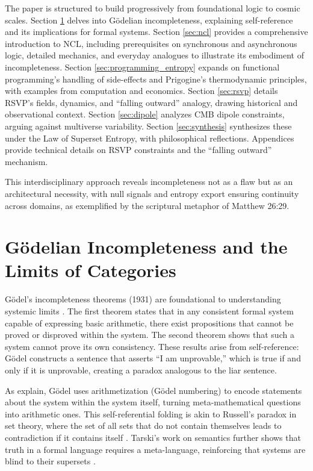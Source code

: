 \documentclass{article}
\begin{document}
The paper is structured to build progressively from foundational logic to cosmic scales. Section \ref{sec:godel} delves into G\"{o}delian incompleteness, explaining self-reference and its implications for formal systems. Section \ref{sec:ncl} provides a comprehensive introduction to NCL, including prerequisites on synchronous and asynchronous logic, detailed mechanics, and everyday analogues to illustrate its embodiment of incompleteness. Section \ref{sec:programming_entropy} expands on functional programming's handling of side-effects and Prigogine's thermodynamic principles, with examples from computation and economics. Section \ref{sec:rsvp} details RSVP's fields, dynamics, and ``falling outward'' analogy, drawing historical and observational context. Section \ref{sec:dipole} analyzes CMB dipole constraints, arguing against multiverse variability. Section \ref{sec:synthesis} synthesizes these under the Law of Superset Entropy, with philosophical reflections. Appendices provide technical details on RSVP constraints and the ``falling outward'' mechanism.

This interdisciplinary approach reveals incompleteness not as a flaw but as an architectural necessity, with null signals and entropy export ensuring continuity across domains, as exemplified by the scriptural metaphor of Matthew 26:29.

\section{G\"{o}delian Incompleteness and the Limits of Categories}
\label{sec:godel}
G\"{o}del's incompleteness theorems (1931) are foundational to understanding systemic limits \citep{godel1931}. The first theorem states that in any consistent formal system capable of expressing basic arithmetic, there exist propositions that cannot be proved or disproved within the system. The second theorem shows that such a system cannot prove its own consistency. These results arise from self-reference: G\"{o}del constructs a sentence that asserts ``I am unprovable,'' which is true if and only if it is unprovable, creating a paradox analogous to the liar sentence.

As \citet{nagel1958} explain, G\"{o}del uses arithmetization (G\"{o}del numbering) to encode statements about the system within the system itself, turning meta-mathematical questions into arithmetic ones. This self-referential folding is akin to Russell's paradox in set theory, where the set of all sets that do not contain themselves leads to contradiction if it contains itself \citep{tarski1956}. Tarski's work on semantics further shows that truth in a formal language requires a meta-language, reinforcing that systems are blind to their supersets \citep{tarski1956}.
\end{document}
